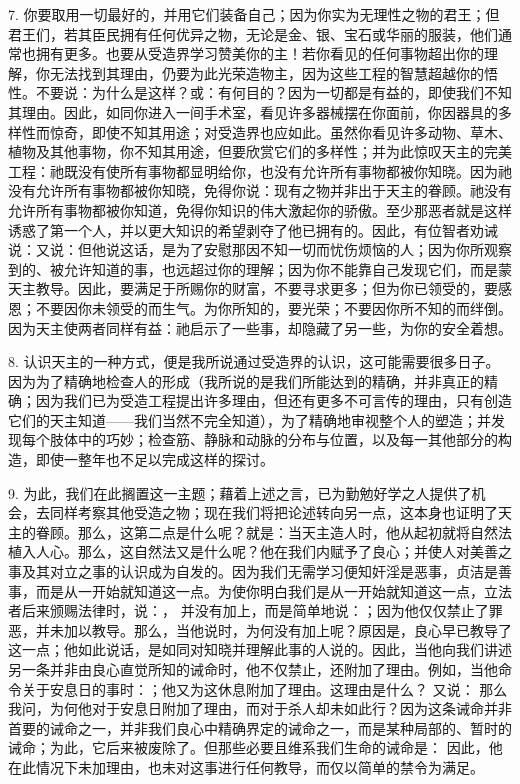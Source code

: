 7. 你要取用一切最好的，并用它们装备自己；因为你实为无理性之物的君王；但君王们，若其臣民拥有任何优异之物，无论是金、银、宝石或华丽的服装，他们通常也拥有更多。也要从受造界学习赞美你的主！若你看见的任何事物超出你的理解，你无法找到其理由，仍要为此光荣造物主，因为这些工程的智慧超越你的悟性。不要说：为什么是这样？或：有何目的？因为一切都是有益的，即使我们不知其理由。因此，如同你进入一间手术室，看见许多器械摆在你面前，你因器具的多样性而惊奇，即使不知其用途；对受造界也应如此。虽然你看见许多动物、草木、植物及其他事物，你不知其用途，但要欣赏它们的多样性；并为此惊叹天主的完美工程：祂既没有使所有事物都显明给你，也没有允许所有事物都被你知晓。因为祂没有允许所有事物都被你知晓，免得你说：现有之物并非出于天主的眷顾。祂没有允许所有事物都被你知道，免得你知识的伟大激起你的骄傲。至少那恶者就是这样诱惑了第一个人，并以更大知识的希望剥夺了他已拥有的。因此，有位智者劝诫说：又说：但他说这话，是为了安慰那因不知一切而忧伤烦恼的人；因为你所观察到的、被允许知道的事，也远超过你的理解；因为你不能靠自己发现它们，而是蒙天主教导。因此，要满足于所赐你的财富，不要寻求更多；但为你已领受的，要感恩；不要因你未领受的而生气。为你所知的，要光荣；不要因你所不知的而绊倒。因为天主使两者同样有益：祂启示了一些事，却隐藏了另一些，为你的安全着想。\par

8. 认识天主的一种方式，便是我所说通过受造界的认识，这可能需要很多日子。因为为了精确地检查人的形成（我所说的是我们所能达到的精确，并非真正的精确；因为我们已为受造工程提出许多理由，但还有更多不可言传的理由，只有创造它们的天主知道——我们当然不完全知道），为了精确地审视整个人的塑造；并发现每个肢体中的巧妙；检查筋、静脉和动脉的分布与位置，以及每一其他部分的构造，即使一整年也不足以完成这样的探讨。\par

9. 为此，我们在此搁置这一主题；藉着上述之言，已为勤勉好学之人提供了机会，去同样考察其他受造之物；现在我们将把论述转向另一点，这本身也证明了天主的眷顾。那么，这第二点是什么呢？就是：当天主造人时，他从起初就将自然法植入人心。那么，这自然法又是什么呢？他在我们内赋予了良心；并使人对美善之事及其对立之事的认识成为自发的。因为我们无需学习便知奸淫是恶事，贞洁是善事，而是从一开始就知道这一点。为使你明白我们是从一开始就知道这一点，立法者后来颁赐法律时，说：， 并没有加上，而是简单地说：；因为他仅仅禁止了罪恶，并未加以教导。那么，当他说时，为何没有加上呢？原因是，良心早已教导了这一点；他如此说话，是如同对知晓并理解此事的人说的。因此，当他向我们讲述另一条并非由良心直觉所知的诫命时，他不仅禁止，还附加了理由。例如，当他命令关于安息日的事时：；他又为这休息附加了理由。这理由是什么？  又说：  那么我问，为何他对于安息日附加了理由，而对于杀人却未如此行？因为这条诫命并非首要的诫命之一，并非我们良心中精确界定的诫命之一，而是某种局部的、暂时的诫命；为此，它后来被废除了。但那些必要且维系我们生命的诫命是： 因此，他在此情况下未加理由，也未对这事进行任何教导，而仅以简单的禁令为满足。\par

